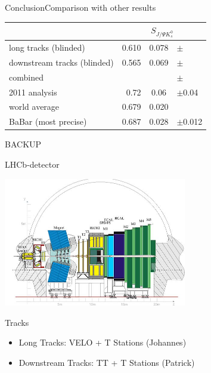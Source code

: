 \documentclass{beamer}
\newcommand{\SJPsi}{S_{J/\Psi K_s^0}}
\begin{document}
\begin{frame}{Conclusion}{Comparison with other results}
\begin{center}
\begin{tabular}{l r@{$\pm$}c@{}l}
\hline \hline
& \multicolumn{3}{c}{$\SJPsi$} \\ \hline
long tracks (blinded) & 0.610 & 0.078 & $\pm$\\
downstream tracks (blinded) & 0.565 & 0.069 & $\pm$\\ \hline
combined & & &$\pm$ \\ \hline
2011 analysis & 0.72 & 0.06 &$\pm$0.04\\
world average & 0.679 & 0.020 &\\
BaBar (most precise) & 0.687 & 0.028 &$\pm$0.012 \\ \hline \hline
\end{tabular}
\end{center}
\end{frame}

\begin{frame}
\begin{center}
BACKUP
\end{center}
\end{frame}

	
	\begin{frame}{LHCb-detector}
	\begin{center}
	\includegraphics[width = 0.6\textwidth]{detector}
	\end{center}
	\begin{block}{Tracks}
	\begin{itemize}
		\item Long Tracks: VELO + T Stations (Johannes)
		\item Downstream Tracks: TT + T Stations (Patrick)
	\end{itemize}
	\end{block}	
	\end{frame}
	
\end{document}
